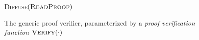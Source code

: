 \begin{figure}[t]
\begin{algorithm}[H]
    \caption{\label{alg.generic-verifier} The generic proof verifier, parameterized by a{ \em
        proof verification function} $\textsc{Verify}(\cdot)$}
    \begin{algorithmic}[1]
        \Statex
            \If{$\Pi \neq \emptyset$}
            \EndIf
                \State\textsc{Diffuse}{$(\textsc{ReadProof})$}
            \EndIf
        \EndWhile
        \vskip8pt
    \end{algorithmic}
\end{algorithm}
\end{figure}
